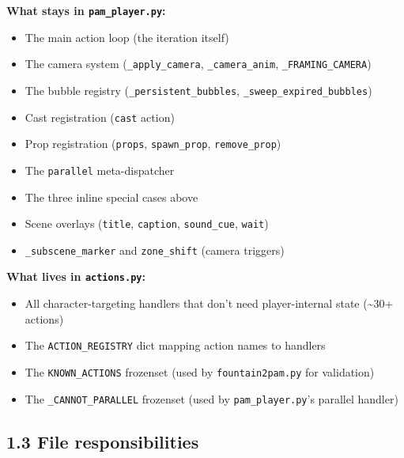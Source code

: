 \documentclass[
  12pt,
  letterpaper,
]{book}
\providecommand{\tightlist}{%
  \setlength{\itemsep}{0pt}\setlength{\parskip}{0pt}}
\begin{document}
\textbf{What stays in \texttt{pam\_player.py}:}

\begin{itemize}
\tightlist
\item
  The main action loop (the iteration itself)
\item
  The camera system (\texttt{\_apply\_camera}, \texttt{\_camera\_anim},
  \texttt{\_FRAMING\_CAMERA})
\item
  The bubble registry (\texttt{\_persistent\_bubbles},
  \texttt{\_sweep\_expired\_bubbles})
\item
  Cast registration (\texttt{cast} action)
\item
  Prop registration (\texttt{props}, \texttt{spawn\_prop},
  \texttt{remove\_prop})
\item
  The \texttt{parallel} meta-dispatcher
\item
  The three inline special cases above
\item
  Scene overlays (\texttt{title}, \texttt{caption}, \texttt{sound\_cue},
  \texttt{wait})
\item
  \texttt{\_subscene\_marker} and \texttt{zone\_shift} (camera triggers)
\end{itemize}

\textbf{What lives in \texttt{actions.py}:}

\begin{itemize}
\tightlist
\item
  All character-targeting handlers that don't need player-internal state
  (\textasciitilde30+ actions)
\item
  The \texttt{ACTION\_REGISTRY} dict mapping action names to handlers
\item
  The \texttt{KNOWN\_ACTIONS} frozenset (used by
  \texttt{fountain2pam.py} for validation)
\item
  The \texttt{\_CANNOT\_PARALLEL} frozenset (used by
  \texttt{pam\_player.py}'s parallel handler)
\end{itemize}

\subsection{1.3 File responsibilities}\label{file-responsibilities}
\end{document}

